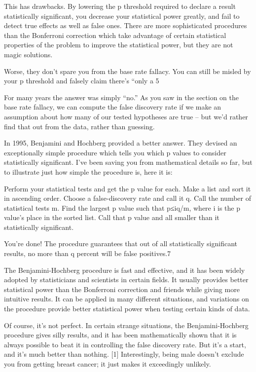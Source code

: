 This has drawbacks. By lowering the p threshold required to declare a result statistically significant, you decrease your statistical power greatly, and fail to detect true effects as well as false ones. There are more sophisticated procedures than the Bonferroni correction which take advantage of certain statistical properties of the problem to improve the statistical power, but they are not magic solutions.

Worse, they don’t spare you from the base rate fallacy. You can still be misled by your p threshold and falsely claim there’s “only a 5%

For many years the answer was simply “no.” As you saw in the section on the base rate fallacy, we can compute the false discovery rate if we make an assumption about how many of our tested hypotheses are true – but we’d rather find that out from the data, rather than guessing.

In 1995, Benjamini and Hochberg provided a better answer. They devised an exceptionally simple procedure which tells you which p values to consider statistically significant. I’ve been saving you from mathematical details so far, but to illustrate just how simple the procedure is, here it is:

    Perform your statistical tests and get the p value for each. Make a list and sort it in ascending order.
    Choose a false-discovery rate and call it q. Call the number of statistical tests m.
    Find the largest p value such that p≤iq/m, where i is the p value’s place in the sorted list.
    Call that p value and all smaller than it statistically significant.

You’re done! The procedure guarantees that out of all statistically significant results, no more than q percent will be false positives.7

The Benjamini-Hochberg procedure is fast and effective, and it has been widely adopted by statisticians and scientists in certain fields. It usually provides better statistical power than the Bonferroni correction and friends while giving more intuitive results. It can be applied in many different situations, and variations on the procedure provide better statistical power when testing certain kinds of data.

Of course, it’s not perfect. In certain strange situations, the Benjamini-Hochberg procedure gives silly results, and it has been mathematically shown that it is always possible to beat it in controlling the false discovery rate. But it’s a start, and it’s much better than nothing.
[1]	Interestingly, being male doesn’t exclude you from getting breast cancer; it just makes it exceedingly unlikely.
